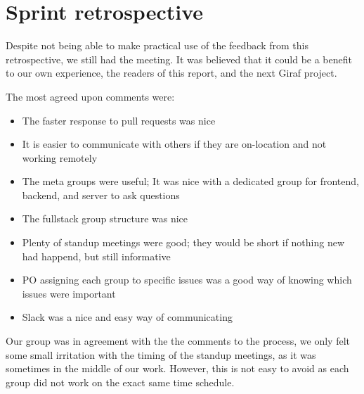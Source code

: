 \section{Sprint retrospective}
Despite not being able to make practical use of the feedback from this retrospective, we still had the meeting. 
It was believed that it could be a benefit to our own experience, the readers of this report, and the next Giraf project.

The most agreed upon comments were:
\begin{itemize}
  \item The faster response to pull requests was nice
  \item It is easier to communicate with others if they are on-location and not working remotely
  \item The meta groups were useful; It was nice with a dedicated group for frontend, backend, and server to ask questions
  \item The fullstack group structure was nice
  \item Plenty of standup meetings were good; they would be short if nothing new had happend, but still informative
  \item PO assigning each group to specific issues was a good way of knowing which issues were important
  \item Slack was a nice and easy way of communicating
\end{itemize}

Our group was in agreement with the the comments to the process, we only felt some small irritation with the timing of the standup meetings, as it was sometimes in the middle of our work. 
However, this is not easy to avoid as each group did not work on the exact same time schedule.

